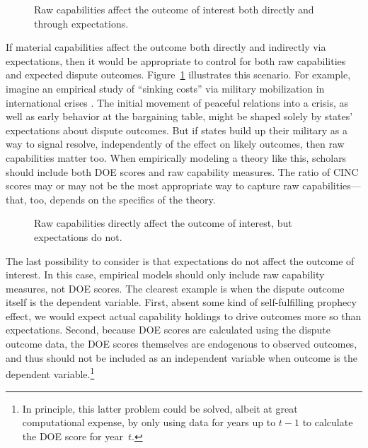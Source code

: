 \begin{figure}[htp]
  \centering
  
  \caption{
    Raw capabilities affect the outcome of interest both directly and through expectations.
  }
  \label{fig:dag-cap1-doe1}
\end{figure}

If material capabilities affect the outcome both directly and indirectly via expectations, then it would be appropriate to control for both raw capabilities and expected dispute outcomes.
Figure~\ref{fig:dag-cap1-doe1} illustrates this scenario.
For example, imagine an empirical study of ``sinking costs'' via military mobilization in international crises \citep{fearon_signaling_1997}.
The initial movement of peaceful relations into a crisis, as well as early behavior at the bargaining table, might be shaped solely by states' expectations about dispute outcomes.
But if states build up their military as a way to signal resolve, independently of the effect on likely outcomes, then raw capabilities matter too.
When empirically modeling a theory like this, scholars should include both DOE scores and raw capability measures.
The ratio of CINC scores may or may not be the most appropriate way to capture raw capabilities---that, too, depends on the specifics of the theory.

\begin{figure}[htp]
  \centering
  
  \caption{
    Raw capabilities directly affect the outcome of interest, but expectations do not.
  }
  \label{fig:dag-cap1-doe0}
\end{figure}

The last possibility to consider is that expectations do not affect the outcome of interest.
In this case, empirical models should only include raw capability measures, not DOE scores.
The clearest example is when the dispute outcome itself is the dependent variable.
First, absent some kind of self-fulfilling prophecy effect, we would expect actual capability holdings to drive outcomes more so than expectations.
Second, because DOE scores are calculated using the dispute outcome data, the DOE scores themselves are endogenous to observed outcomes, and thus should not be included as an independent variable when outcome is the dependent variable.\footnote{%
  In principle, this latter problem could be solved, albeit at great computational expense, by only using data for years up to $t-1$ to calculate the DOE score for year~$t$.
}

